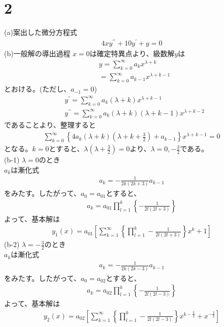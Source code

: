 \documentclass[pdflatex,ja=standard,fleqn]{bxjsarticle}
\begin{document}
\section*{2}
(a)案出した微分方程式
\begin{eqnarray*}
    4xy^{\prime\prime}+10y^{\prime}+y=0
\end{eqnarray*}
(b)一般解の導出過程
$x=0$は確定特異点より、級数解$y$は
\begin{align*}
    & y=\sum_{k=0}^{\infty}a_{k}x^{\lambda+k}\\
    & =\sum_{k=0}^{\infty}a_{k-1}x^{\lambda+k-1}
\end{align*}
とおける。(ただし、$a_{-1}=0$)
\begin{align*}
    & y^{\prime}=\sum_{k=0}^{\infty}a_{k}(\lambda+k)x^{\lambda+k-1} \\
    & y^{\prime\prime}=\sum_{k=0}^{\infty}a_{k}(\lambda+k)(\lambda+k-1)x^{\lambda+k-2}
\end{align*}
であることより、整理すると
\begin{eqnarray*}
    \sum_{k=0}^{\infty}\left\{4a_{k}(\lambda+k)(\lambda+k+\frac{3}{2})+a_{k-1}\right\}x^{\lambda+k-1}=0
\end{eqnarray*}
となる。$k=0$とすると、$\lambda(\lambda+\frac{3}{2})=0$より、$\lambda=0, -\frac{3}{2}$である。\\
(b-1) $\lambda=0$のとき\\
$a_{k}$は漸化式
\begin{eqnarray*}
    a_{k}=-\frac{1}{2k(2k+3)}a_{k-1}
\end{eqnarray*}
をみたす。したがって、$a_{0}=a_{01}$とすると、
\begin{eqnarray*}
    a_{k} = a_{01}\prod_{l=1}^{k}\left\{-\frac{1}{2l(2l+3)}\right\}
\end{eqnarray*}
よって、基本解は
\begin{eqnarray*}
    y_{1}(x)=a_{01}\left[\sum_{k=1}^{\infty}\left\{\prod_{l=1}^{k}-\frac{1}{2l(2l+3)}\right\}x^{k}+1\right]
\end{eqnarray*}
(b-2) $\lambda=-\frac{3}{2}$のとき\\
$a_{k}$は漸化式
\begin{eqnarray*}
    a_{k}=-\frac{1}{2k(2k-3)}a_{k-1}
\end{eqnarray*}
をみたす。したがって、$a_{0}=a_{02}$とすると、
\begin{eqnarray*}
    a_{k} = a_{02}\prod_{l=1}^{k}\left\{-\frac{1}{2l(2l-3)}\right\}
\end{eqnarray*}
よって、基本解は
\begin{eqnarray*}
    y_{2}(x)=a_{02}\left[\sum_{k=1}^{\infty}\left\{\prod_{l=1}^{k}-\frac{1}{2l(2l-3)}\right\}x^{k-\frac{3}{2}}+x^{-\frac{3}{2}}\right]
\end{eqnarray*}
\end{document}
